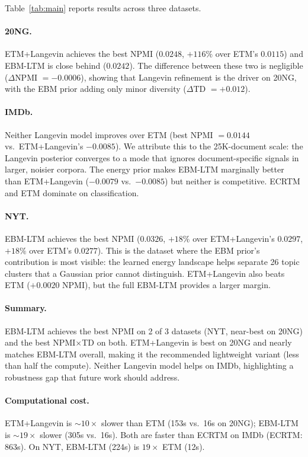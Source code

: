 \documentclass[10pt]{article}
\begin{document}
Table~\ref{tab:main} reports results across three datasets.

\paragraph{20NG.}
ETM+Langevin achieves the best NPMI ($0.0248$, $+116\%$ over ETM's $0.0115$) and
EBM-LTM is close behind ($0.0242$). The difference between these two is negligible
($\Delta$NPMI $= -0.0006$), showing that Langevin refinement is the driver on 20NG,
with the EBM prior adding only minor diversity ($\Delta$TD $= +0.012$).

\paragraph{IMDb.}
Neither Langevin model improves over ETM (best NPMI $= 0.0144$ vs.\ ETM+Langevin's
$-0.0085$). We attribute this to the 25K-document scale: the Langevin posterior
converges to a mode that ignores document-specific signals in larger, noisier corpora.
The energy prior makes EBM-LTM marginally better than ETM+Langevin ($-0.0079$ vs.\
$-0.0085$) but neither is competitive. ECRTM and ETM dominate on classification.

\paragraph{NYT.}
EBM-LTM achieves the best NPMI ($0.0326$, $+18\%$ over ETM+Langevin's $0.0297$,
$+18\%$ over ETM's $0.0277$). This is the dataset where the EBM prior's contribution
is most visible: the learned energy landscape helps separate 26 topic clusters that
a Gaussian prior cannot distinguish. ETM+Langevin also beats ETM ($+0.0020$ NPMI),
but the full EBM-LTM provides a larger margin.

\paragraph{Summary.}
EBM-LTM achieves the best NPMI on 2 of 3 datasets (NYT, near-best on 20NG) and the
best NPMI$\times$TD on both. ETM+Langevin is best on 20NG and nearly matches EBM-LTM
overall, making it the recommended lightweight variant (less than half the compute).
Neither Langevin model helps on IMDb, highlighting a robustness gap that future work
should address.

\paragraph{Computational cost.}
ETM+Langevin is $\sim\!10\times$ slower than ETM (153s vs.\ 16s on 20NG);
EBM-LTM is $\sim\!19\times$ slower (305s vs.\ 16s). Both are faster than
ECRTM on IMDb (ECRTM: 863s). On NYT, EBM-LTM (224s) is $19\times$ ETM (12s).
\end{document}
